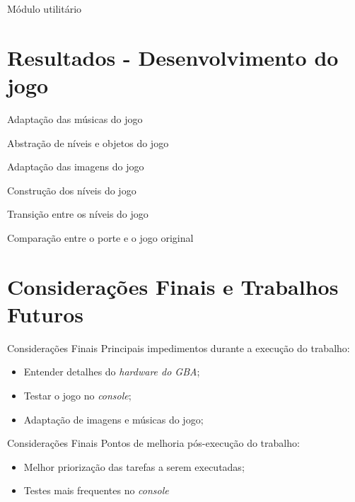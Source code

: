 \documentclass[notes, mathserif]{beamer}
\begin{document}
\begin{frame}{M\'odulo utilit\'ario}
\end{frame}

\section{Resultados - Desenvolvimento do jogo}

\begin{frame}{Adapta\c c\~ao das m\'usicas do jogo}
\end{frame}

\begin{frame}{Abstra\c c\~ao de n\'iveis e objetos do jogo}
\end{frame}

\begin{frame}{Adapta\c c\~ao das imagens do jogo}
\end{frame}

\begin{frame}{Constru\c c\~ao dos n\'iveis do jogo}
\end{frame}

\begin{frame}{Transi\c c\~ao entre os n\'iveis do jogo}
\end{frame}

\begin{frame}{Compara\c c\~ao entre o porte e o jogo original}
\end{frame}

\section{Considera\c c\~oes Finais e Trabalhos Futuros}

\begin{frame}{Considera\c c\~oes Finais}
	Principais impedimentos durante a execu\c c\~ao do trabalho:
	\begin{itemize}[<+->]
		\item Entender detalhes do \textit{hardware do GBA};
		\item Testar o jogo no \textit{console};
		\item Adapta\c c\~ao de imagens e m\'usicas do jogo;
	\end{itemize}
\end{frame}

\begin{frame}{Considera\c c\~oes Finais}
	Pontos de melhoria p\'os-execu\c c\~ao do trabalho:
	\begin{itemize}[<+->]
		\item Melhor prioriza\c c\~ao das tarefas a serem executadas;
		\item Testes mais frequentes no \textit{console}
	\end{itemize}
\end{frame}
\end{document}
